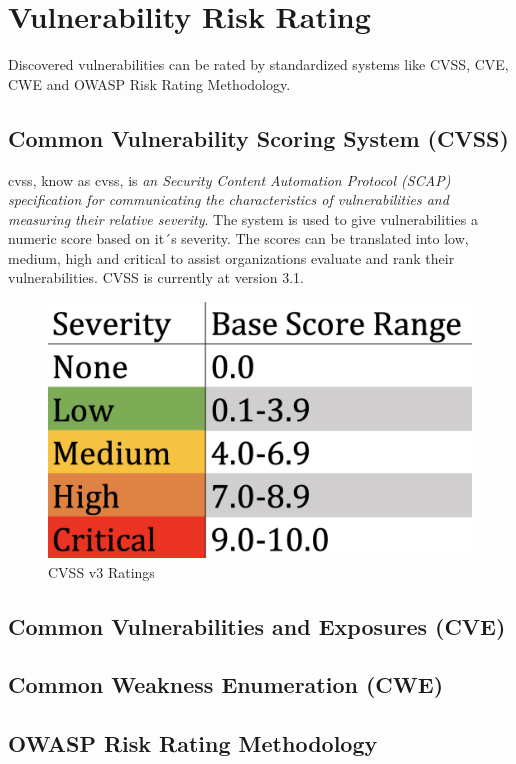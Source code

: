 \section{Vulnerability Risk Rating}
Discovered vulnerabilities can be rated by standardized systems like CVSS, CVE, CWE and OWASP Risk Rating Methodology. 
\subsection{Common Vulnerability Scoring System (CVSS)}
\acrlong{cvss}, know as \acrshort{cvss}, is \textit{an Security Content Automation Protocol (SCAP) specification for communicating the characteristics of vulnerabilities and measuring their relative severity}\cite{nistCVSS}. The system is used to give vulnerabilities a numeric score based on it´s severity. The scores can be translated into low, medium, high and critical to assist organizations evaluate and rank their vulnerabilities. CVSS is currently at version 3.1. \cite{CVSS}
\begin{figure}[htp]
    \centering
    \includegraphics[scale=0.3]{Images/CVSS.png}
    \caption{CVSS v3 Ratings \cite{cvssrating}}
    \label{fig:my_label}
\end{figure}


\subsection{Common Vulnerabilities and Exposures (CVE)}

\subsection{Common Weakness Enumeration (CWE)}
\subsection{OWASP Risk Rating Methodology}
